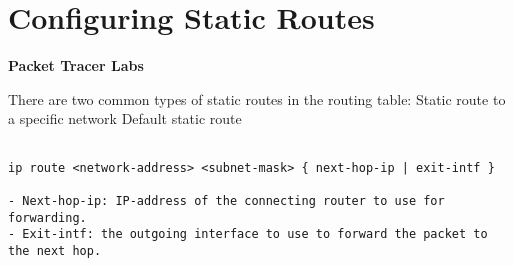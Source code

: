 \documentclass[../EngineeringJournal_CDavis.tex]{subfiles}
\begin{document}

\chapter*{Configuring \linebreak[1] Static Routes \hspace*{\fill}{2020}}
\noindent\textbf{{Packet Tracer Labs} }                             


\hspace{0.2cm}
\begin{tcolorbox}[width=6.3in]
  \begin{outline}
    \1 There are two common types of static routes in the routing table:
      \2 Static route to a specific network
      \2 Default static route
  \end{outline}
\end{tcolorbox}
\hspace{0.2cm}


\hspace{0.2cm}
\begin{tcolorbox}[width=6.3in]
\scriptsize
\begin{verbatim}

ip route <network-address> <subnet-mask> { next-hop-ip | exit-intf }

- Next-hop-ip: IP-address of the connecting router to use for forwarding.
- Exit-intf: the outgoing interface to use to forward the packet to the next hop.

\end{verbatim}
\normalsize
\end{tcolorbox}
\hspace{0.2cm}
\end{document}

